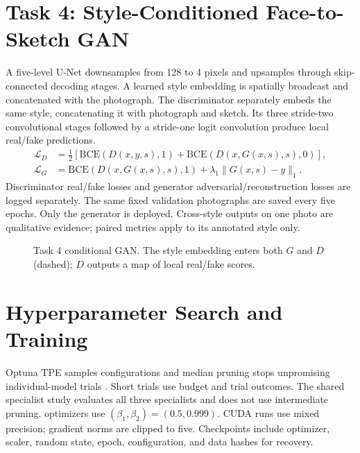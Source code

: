 \documentclass[conference]{IEEEtran}
\begin{document}
\section{Task 4: Style-Conditioned Face-to-Sketch GAN}
A five-level U-Net downsamples from 128 to 4 pixels and upsamples through
skip-connected decoding stages. A learned style embedding is spatially
broadcast and concatenated with the photograph. The discriminator separately
embeds the same style, concatenating it with photograph and sketch. Its three
stride-two convolutional stages followed by a stride-one logit convolution
produce local real/fake predictions. %
\begin{align}
\mathcal{L}_D&=\tfrac12[\mathrm{BCE}(D(x,y,s),1)+\mathrm{BCE}(D(x,G(x,s),s),0)],\\
\mathcal{L}_G&=\mathrm{BCE}(D(x,G(x,s),s),1)+\lambda_1\|G(x,s)-y\|_1.
\end{align}
Discriminator real/fake losses and generator adversarial/reconstruction losses
are logged separately. The same fixed validation photographs are saved every
five epochs. Only the generator is deployed. Cross-style outputs on one photo
are qualitative evidence; paired metrics apply to its annotated style only.

\begin{figure}[!ht]\centering
{}\caption{Task 4 conditional GAN. The style embedding enters both $G$ and $D$ (dashed); $D$ outputs a map of local real/fake scores.}\end{figure}


\section{Hyperparameter Search and Training}
Optuna TPE samples configurations and median pruning stops unpromising
individual-model trials \cite{optuna,optunapaper}. Short trials use %
budget and trial outcomes. The shared specialist study evaluates all three
specialists and does not use intermediate pruning. %
optimizers use $(\beta_1,\beta_2)=(0.5,0.999)$. CUDA runs use mixed precision;
gradient norms are clipped to five. Checkpoints include optimizer, scaler,
random state, epoch, configuration, and data hashes for recovery.
\end{document}
